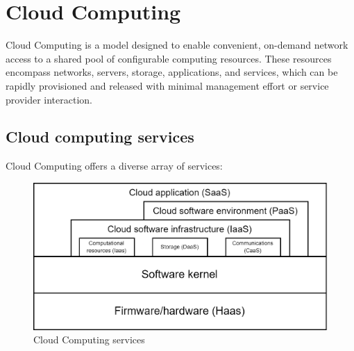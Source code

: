 \section{Cloud Computing}

Cloud Computing is a model designed to enable convenient, on-demand network access to a shared pool of configurable computing resources.
These resources encompass networks, servers, storage, applications, and services, which can be rapidly provisioned and released with minimal management effort or service provider interaction.

\subsection{Cloud computing services}
Cloud Computing offers a diverse array of services:
\begin{figure}[H]
    \centering
    \includegraphics[width=0.5\linewidth]{images/xaas.png}
    \caption{Cloud Computing services}
\end{figure}

